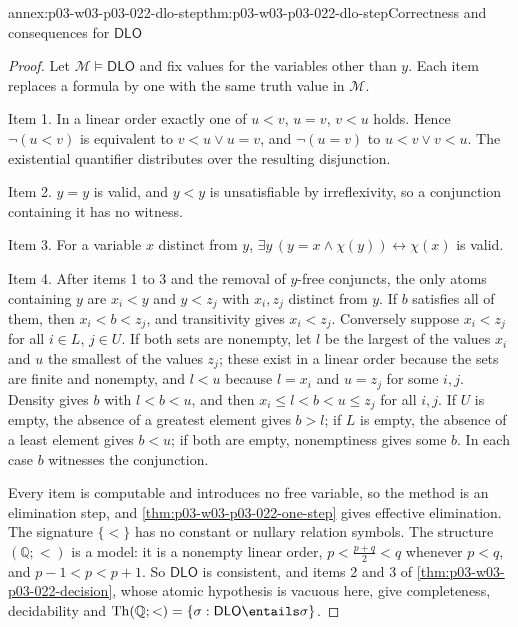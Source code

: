 \begin{annexitem}{annex:p03-w03-p03-022-dlo-step}{thm:p03-w03-p03-022-dlo-step}{Correctness and consequences for \(\mathsf{DLO}\)}
\begin{proof}
Let \(\mathcal M\models\mathsf{DLO}\) and fix values for the variables other
than \(y\). Each item replaces a formula by one with the same truth value in
\(\mathcal M\).

Item 1. In a linear order exactly one of \(u<v\), \(u=v\), \(v<u\) holds.
Hence \(\neg(u<v)\) is equivalent to \(v<u\lor u=v\), and \(\neg(u=v)\) to
\(u<v\lor v<u\). The existential quantifier distributes over the resulting
disjunction.

Item 2. \(y=y\) is valid, and \(y<y\) is unsatisfiable by irreflexivity,
so a conjunction containing it has no witness.

Item 3. For a variable \(x\) distinct from \(y\),
\(\exists y\,(y=x\land\chi(y))\leftrightarrow\chi(x)\) is valid.

Item 4. After items 1 to 3 and the removal of \(y\)-free conjuncts, the
only atoms containing \(y\) are \(x_i<y\) and \(y<z_j\) with \(x_i,z_j\)
distinct from \(y\). If \(b\) satisfies all of them, then
\(x_i<b<z_j\), and transitivity gives \(x_i<z_j\). Conversely suppose
\(x_i<z_j\) for all \(i\in L\), \(j\in U\). If both sets are nonempty, let
\(l\) be the largest of the values \(x_i\) and \(u\) the smallest of the
values \(z_j\); these exist in a linear order because the sets are finite
and nonempty, and \(l<u\) because \(l=x_i\) and \(u=z_j\) for some
\(i,j\). Density gives \(b\) with \(l<b<u\), and then
\(x_i\le l<b<u\le z_j\) for all \(i,j\). If \(U\) is empty, the absence of
a greatest element gives \(b>l\); if \(L\) is empty, the absence of a least
element gives \(b<u\); if both are empty, nonemptiness gives some \(b\).
In each case \(b\) witnesses the conjunction.

Every item is computable and introduces no free variable, so the method is
an elimination step, and \cref{thm:p03-w03-p03-022-one-step} gives
effective elimination. The signature \(\{<\}\) has no constant or nullary
relation symbols. The structure \((\mathbb Q;<)\) is a model: it is a
nonempty linear order, \(p<\tfrac{p+q}2<q\) whenever \(p<q\), and
\(p-1<p<p+1\). So \(\mathsf{DLO}\) is consistent, and items 2 and 3 of
\cref{thm:p03-w03-p03-022-decision}, whose atomic hypothesis is vacuous
here, give completeness, decidability and \(\operatorname{Th}(\mathbb Q;<)=
\{\sigma:\mathsf{DLO}\entails\sigma\}\).
\end{proof}
\end{annexitem}

